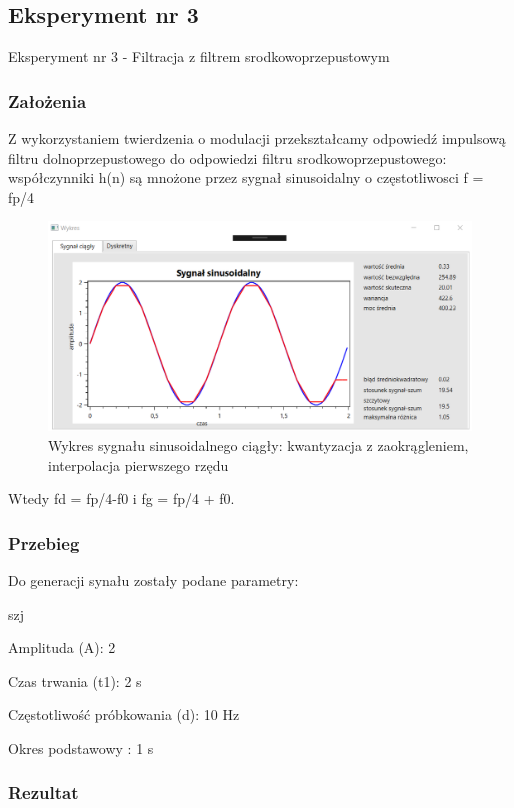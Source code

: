 \documentclass[12pt]{article}
\begin{document}
\subsection{Eksperyment nr 3}

Eksperyment nr 3  - Filtracja z filtrem srodkowoprzepustowym
\subsubsection{Założenia}
Z wykorzystaniem twierdzenia o modulacji przekształcamy odpowiedź impulsową filtru dolnoprzepustowego do odpowiedzi filtru srodkowoprzepustowego:
współczynniki h(n) są mnożone przez sygnał sinusoidalny  o częstotliwosci f = fp/4

\begin{figure}[h!]
 \centering
 \includegraphics[width=12.3cm]{SinKwantZaokrIntA2T2f10H2t1C.PNG}
 \vspace{-0.3cm}
 \caption{Wykres sygnału sinusoidalnego ciągły: kwantyzacja z zaokrągleniem, interpolacja pierwszego rzędu}
 \label{Wykres dla wyników eksperymentu drugiego}
\end{figure}

Wtedy fd = fp/4-f0 i fg = fp/4 + f0.

\subsubsection{Przebieg}
Do generacji synału zostały podane parametry:

\begin{labeling}{szj}
\item [Amplituda (A):] 2
\item [Czas trwania (t1):] 2 s
\item [Częstotliwość próbkowania (d): ] 10 Hz
\item [Okres podstawowy :] 1 s
\end{labeling}
\subsubsection{Rezultat}
\end{document}
